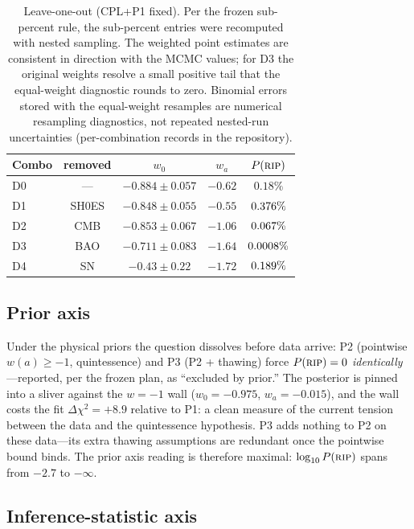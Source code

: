 \documentclass[a4paper,11pt]{article}
\newcommand{\wz}{\ensuremath{w_0}}
\newcommand{\wa}{\ensuremath{w_a}}
\begin{document}
\begin{table}[t]
\caption{Leave-one-out (CPL+P1 fixed). Per the frozen sub-percent rule,
the sub-percent entries were recomputed with nested sampling. The weighted
point estimates are consistent in direction with the MCMC values; for D3 the
original weights resolve a small positive tail that the equal-weight diagnostic
rounds to zero. Binomial errors stored with the equal-weight resamples are
numerical resampling diagnostics, not repeated nested-run uncertainties
(per-combination records in the repository).}\label{tab:loo}
\begin{tabular}{lcccc}
Combo & removed & $\wz$ & $\wa$ & $P(\textsc{rip})$ \\
\hline
D0 & --- & $-0.884\pm0.057$ & $-0.62$ & $0.18\%$ \\
D1 & SH0ES & $-0.848\pm0.055$ & $-0.55$ & $0.376\%$ \\
D2 & CMB & $-0.853\pm0.067$ & $-1.06$ & $0.067\%$ \\
D3 & BAO & $-0.711\pm0.083$ & $-1.64$ & $0.0008\%$ \\
D4 & SN & $-0.43\pm0.22$ & $-1.72$ & $0.189\%$ \\
\end{tabular}
\end{table}

\subsection{Prior axis}\label{sec:fprior}

Under the physical priors the question dissolves before data arrive: P2
(pointwise $w(a)\ge-1$, quintessence) and P3 (P2 + thawing) force
$P(\textsc{rip})=0$ \emph{identically}---reported, per the frozen plan, as
``excluded by prior.'' The posterior is pinned into a sliver against the
$w=-1$ wall ($\wz=-0.975$, $\wa=-0.015$), and the wall costs the fit
$\Delta\chi^2=+8.9$ relative to P1: a clean measure of the current tension
between the data and the quintessence hypothesis. P3 adds nothing to P2 on
these data---its extra thawing assumptions are redundant once the pointwise
bound binds. The prior axis reading is therefore maximal:
$\log_{10}P(\textsc{rip})$ spans from $-2.7$ to $-\infty$.

\subsection{Inference-statistic axis}\label{sec:fstat}
\end{document}
